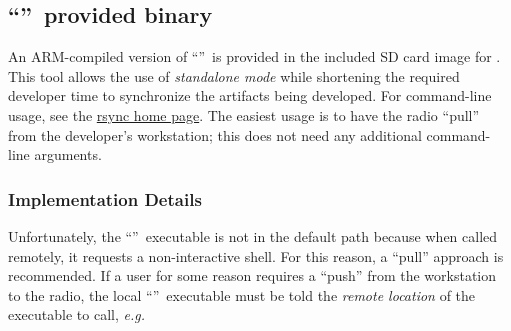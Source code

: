 \iffalse
This file is protected by Copyright. Please refer to the COPYRIGHT file
distributed with this source distribution.

This file is part of OpenCPI <http://www.opencpi.org>

OpenCPI is free software: you can redistribute it and/or modify it under the
terms of the GNU Lesser General Public License as published by the Free Software
Foundation, either version 3 of the License, or (at your option) any later
version.

OpenCPI is distributed in the hope that it will be useful, but WITHOUT ANY
WARRANTY; without even the implied warranty of MERCHANTABILITY or FITNESS FOR A
PARTICULAR PURPOSE. See the GNU Lesser General Public License for more details.

You should have received a copy of the GNU Lesser General Public License along
with this program. If not, see <http://www.gnu.org/licenses/>.
\fi

\newlength{\savedparindentrsync}%
\setlength{\savedparindentrsync}{\parindent}%
\setlength{\parindent}{0pt} %
\providecommand{\forceindent}{\leavevmode{\parindent=1em\indent}}%
\def\qrsync{``''~}
\subsection{\qrsync provided binary}
\label{sec:rsync}
An ARM-compiled version of \qrsync is provided in the included SD card image for \rccplatform.
This tool allows the use of \textit{standalone mode} while shortening the required developer time to synchronize the artifacts being developed.
For command-line usage, see the \href{https://rsync.samba.org/documentation.html}{rsync home page}.
The easiest usage is to have the radio ``pull'' from the developer's workstation; this does not need any additional command-line arguments.
\subsubsection*{Implementation Details}
Unfortunately, the \qrsync executable is not in the default path because when called remotely, it requests a non-interactive shell. For this reason, a ``pull'' approach is recommended.
If a user for some reason requires a ``push'' from the workstation to the radio, the local \qrsync executable must be told the \textit{remote location} of the  executable to call, \textit{e.g.} 
\setlength{\parindent}{\savedparindentrsync}%
